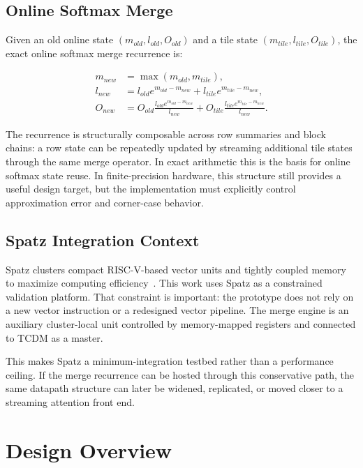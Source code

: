 \documentclass[conference]{IEEEtran}
\begin{document}
\subsection{Online Softmax Merge}

Given an old online state $(m_{old}, l_{old}, O_{old})$ and a tile state
$(m_{tile}, l_{tile}, O_{tile})$, the exact online softmax merge recurrence is:

\begin{align}
m_{new} &= \max(m_{old}, m_{tile}), \\
l_{new} &= l_{old}e^{m_{old}-m_{new}} +
           l_{tile}e^{m_{tile}-m_{new}}, \\
O_{new} &= O_{old}
          \frac{l_{old}e^{m_{old}-m_{new}}}{l_{new}} +
          O_{tile}
          \frac{l_{tile}e^{m_{tile}-m_{new}}}{l_{new}}.
\end{align}

The recurrence is structurally composable across row summaries and block
chains: a row state can be repeatedly updated by streaming additional tile
states through the same merge operator. In exact arithmetic this is the basis
for online softmax state reuse. In finite-precision hardware, this structure
still provides a useful design target, but the implementation must explicitly
control approximation error and corner-case behavior.

\subsection{Spatz Integration Context}

Spatz clusters compact RISC-V-based vector units and tightly coupled memory to
maximize computing efficiency~\cite{spatz2023}. This work uses Spatz as a
constrained validation platform. That constraint is important: the prototype
does not rely on a new vector instruction or a redesigned vector pipeline. The
merge engine is an auxiliary cluster-local unit controlled by memory-mapped
registers and connected to TCDM as a master.

This makes Spatz a minimum-integration testbed rather than a performance
ceiling. If the merge recurrence can be hosted through this conservative path,
the same datapath structure can later be widened, replicated, or moved closer
to a streaming attention front end.

\section{Design Overview}
\end{document}
